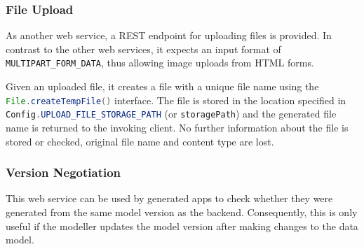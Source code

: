 \subsubsection{File Upload}

As another web service, a REST endpoint for uploading files is provided.
In contrast to the other web services, it expects an input format of \lstinline|MULTIPART_FORM_DATA|, thus allowing image uploads from HTML forms.

Given an uploaded file, it creates a file with a unique file name using the \lstinline[language=Java]|File.createTempFile()| interface. The file is stored in the location specified in \lstinline[language=Java]|Config.UPLOAD_FILE_STORAGE_PATH| (or \lstinline|storagePath|) and the generated file name is returned to the invoking client. No further information about the file is stored or checked, \ie original file name and content type are lost.

\subsubsection{Version Negotiation} 
This web service can be used by generated apps to check whether they were generated from the same model version as the backend. Consequently, this is only useful if the modeller updates the model version after making changes to the data model.

